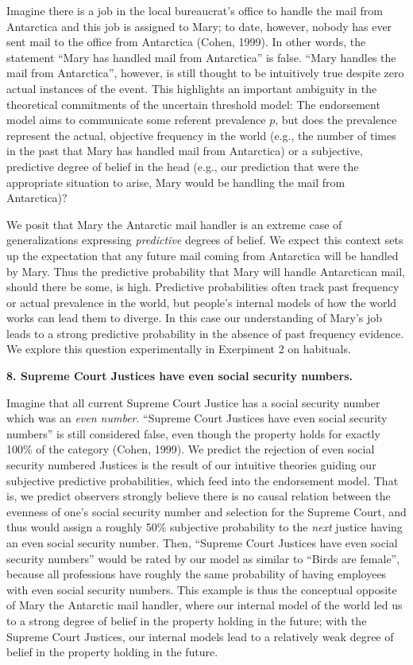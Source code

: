\documentclass[english,,man,floatsintext]{apa6}
\theoremstyle{definition}
\theoremstyle{definition}
\theoremstyle{definition}
\theoremstyle{remark}
\begin{document}
Imagine there is a job in the local bureaucrat's office to handle the
mail from Antarctica and this job is assigned to Mary; to date, however,
nobody has ever sent mail to the office from Antarctica (Cohen, 1999).
In other words, the statement \enquote{Mary has handled mail from
Antarctica} is false. \enquote{Mary handles the mail from Antarctica},
however, is still thought to be intuitively true despite zero actual
instances of the event. This highlights an important ambiguity in the
theoretical commitments of the uncertain threshold model: The
endorsement model aims to communicate some referent prevalence \(p\),
but does the prevalence represent the actual, objective frequency in the
world (e.g., the number of times in the past that Mary has handled mail
from Antarctica) or a subjective, predictive degree of belief in the
head (e.g., our prediction that were the appropriate situation to arise,
Mary would be handling the mail from Antarctica)?

We posit that Mary the Antarctic mail handler is an extreme case of
generalizations expressing \emph{predictive} degrees of belief. We
expect this context sets up the expectation that any future mail coming
from Antarctica will be handled by Mary. Thus the predictive probability
that Mary will handle Antarctican mail, should there be some, is high.
Predictive probabilities often track past frequency or actual prevalence
in the world, but people's internal models of how the world works can
lead them to diverge. In this case our understanding of Mary's job leads
to a strong predictive probability in the absence of past frequency
evidence. We explore this question experimentally in Exerpiment 2 on
habituals.

\textbf{8. Supreme Court Justices have even social security numbers.}

Imagine that all current Supreme Court Justice has a social security
number which was an \emph{even number}. \enquote{Supreme Court Justices
have even social security numbers} is still considered false, even
though the property holds for exactly 100\% of the category (Cohen,
1999). We predict the rejection of even social security numbered
Justices is the result of our intuitive theories guiding our subjective
predictive probabilities, which feed into the endorsement model. That
is, we predict observers strongly believe there is no causal relation
between the evenness of one's social security number and selection for
the Supreme Court, and thus would assign a roughly 50\% subjective
probability to the \emph{next} justice having an even social security
number. Then, \enquote{Supreme Court Justices have even social security
numbers} would be rated by our model as similar to \enquote{Birds are
female}, because all professions have roughly the same probability of
having employees with even social security numbers. This example is thus
the conceptual opposite of Mary the Antarctic mail handler, where our
internal model of the world led us to a strong degree of belief in the
property holding in the future; with the Supreme Court Justices, our
internal models lead to a relatively weak degree of belief in the
property holding in the future.
\end{document}
